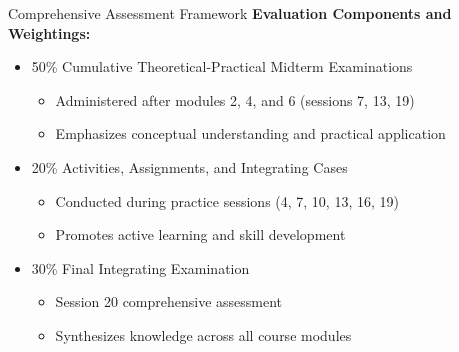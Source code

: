 \documentclass[10pt,aspectratio=169]{beamer}
\newcommand{\concept}[1]{\textcolor{mDarkTeal}{\textbf{#1}}}
\begin{document}
\begin{frame}{Comprehensive Assessment Framework}
    \concept{Evaluation Components and Weightings:}
    
    \vspace{0.3cm}
    
    \begin{itemize}
        \item 50\% Cumulative Theoretical-Practical Midterm Examinations
        \begin{itemize}
            \item[\textbullet] Administered after modules 2, 4, and 6 (sessions 7, 13, 19)
            \item[\textbullet] Emphasizes conceptual understanding and practical application
        \end{itemize}
        
        \item 20\% Activities, Assignments, and Integrating Cases
        \begin{itemize}
            \item[\textbullet] Conducted during practice sessions (4, 7, 10, 13, 16, 19)
            \item[\textbullet] Promotes active learning and skill development
        \end{itemize}
        
        \item 30\% Final Integrating Examination
        \begin{itemize}
            \item[\textbullet] Session 20 comprehensive assessment
            \item[\textbullet] Synthesizes knowledge across all course modules
        \end{itemize}
    \end{itemize}
\end{frame}
\end{document}
